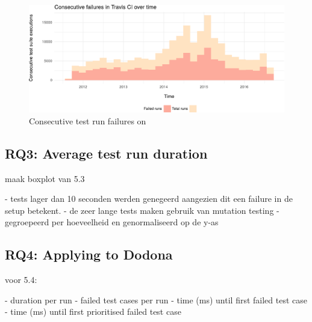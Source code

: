 \begin{figure}[htbp!]
	\centering
	\includegraphics[width=\textwidth]{assets/charts/rq2-consecutive-failure.pdf}
	\caption{Consecutive test run failures on \travisci{}}
	\label{fig:rq2-consecutive-failure}
\end{figure}

\subsection{RQ3: Average test run duration}

maak boxplot van 5.3

- tests lager dan 10 seconden werden genegeerd aangezien dit een failure in de setup betekent.
- de zeer lange tests maken gebruik van mutation testing
- gegroepeerd per hoeveelheid en genormaliseerd op de y-as


\subsection{RQ4: Applying \tcp{} to Dodona}

voor 5.4:

- duration per run
- failed test cases per run
- time (ms) until first failed test case
- time (ms) until first prioritised failed test case